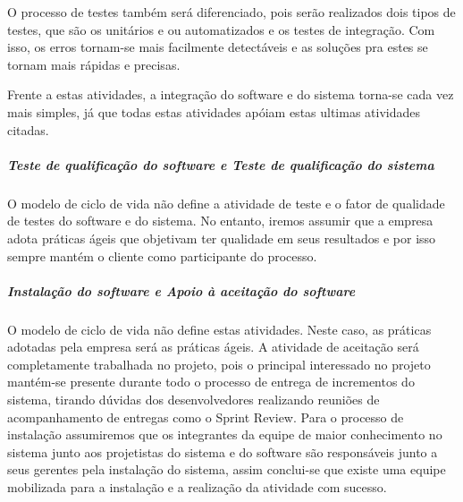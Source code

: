 O processo de testes também será diferenciado, pois serão realizados dois tipos de testes, que são os unitários e ou automatizados e os testes de integração. Com isso, os erros tornam-se mais facilmente detectáveis e as soluções pra estes se tornam mais rápidas e precisas.

Frente a estas atividades, a integração do software e do sistema torna-se cada vez mais simples, já que todas estas atividades apóiam estas ultimas atividades citadas.






\subparagraph{Teste de qualificação do software e Teste de qualificação do sistema }

O modelo de ciclo de vida não define a atividade de teste e o fator de qualidade de testes do software e do sistema. No entanto, iremos assumir que a empresa adota práticas ágeis que objetivam ter qualidade em seus resultados e por isso sempre mantém o cliente como participante do processo.

\subparagraph{Instalação do software e Apoio à aceitação do software}

O modelo de ciclo de vida não define estas atividades. Neste caso, as práticas adotadas pela empresa será as práticas ágeis. A atividade de aceitação será completamente trabalhada no projeto, pois o principal interessado no projeto mantém-se presente durante todo o processo de entrega de incrementos do sistema, tirando dúvidas dos desenvolvedores realizando reuniões de acompanhamento de entregas como o Sprint Review. Para o processo de instalação assumiremos que os integrantes da equipe de maior conhecimento no sistema junto aos projetistas do sistema e do software são responsáveis junto a seus gerentes pela instalação do sistema, assim conclui-se que existe uma equipe mobilizada para a instalação e a realização da atividade com sucesso.

